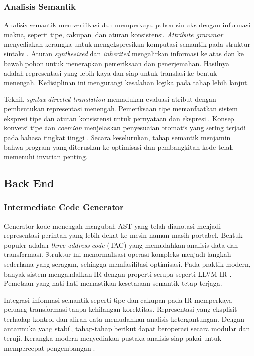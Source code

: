 \documentclass[../main.tex]{subfiles}
\begin{document}
\subsubsection{Analisis Semantik}
Analisis semantik memverifikasi dan memperkaya pohon sintaks dengan informasi makna, seperti tipe, cakupan, dan aturan konsistensi. \emph{Attribute grammar} menyediakan kerangka untuk mengekspresikan komputasi semantik pada struktur sintaks \citep{WikiAttributeGrammar}. Aturan \emph{synthesized} dan \emph{inherited} mengalirkan informasi ke atas dan ke bawah pohon untuk menerapkan pemeriksaan dan penerjemahan. Hasilnya adalah representasi yang lebih kaya dan siap untuk translasi ke bentuk menengah. Kedisiplinan ini mengurangi kesalahan logika pada tahap lebih lanjut.

Teknik \emph{syntax-directed translation} memadukan evaluasi atribut dengan pembentukan representasi menengah. Pemeriksaan tipe memanfaatkan sistem ekspresi tipe dan aturan konsistensi untuk pernyataan dan ekspresi \citep{WikiTypeSystem,WikiTypeChecking}. Konsep konversi tipe dan \emph{coercion} menjelaskan penyesuaian otomatis yang sering terjadi pada bahasa tingkat tinggi \citep{WikiCoercion}. Secara keseluruhan, tahap semantik menjamin bahwa program yang diteruskan ke optimisasi dan pembangkitan kode telah memenuhi invarian penting.

\subsection{Back End}
\subsubsection{Intermediate Code Generator}
Generator kode menengah mengubah AST yang telah dianotasi menjadi representasi perintah yang lebih dekat ke mesin namun masih portabel. Bentuk populer adalah \emph{three-address code} (TAC) yang memudahkan analisis data dan transformasi. Struktur ini menormalisasi operasi kompleks menjadi langkah sederhana yang seragam, sehingga memfasilitasi optimisasi. Pada praktik modern, banyak sistem mengandalkan IR dengan properti serupa seperti LLVM IR \citep{LLVMOverview,WikiTAC}. Pemetaan yang hati-hati memastikan kesetaraan semantik tetap terjaga.

Integrasi informasi semantik seperti tipe dan cakupan pada IR memperkaya peluang transformasi tanpa kehilangan korektitas. Representasi yang eksplisit terhadap kontrol dan aliran data memudahkan analisis ketergantungan. Dengan antarmuka yang stabil, tahap-tahap berikut dapat beroperasi secara modular dan teruji. Kerangka modern menyediakan pustaka analisis siap pakai untuk mempercepat pengembangan \citep{LLVMOverview}.
\end{document}
